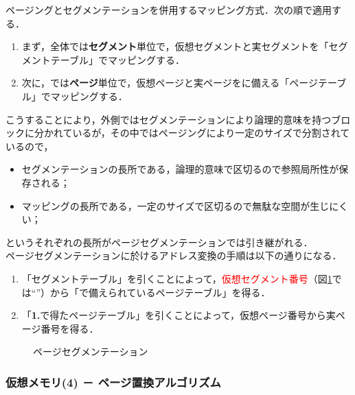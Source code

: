 \begin{enumerate}[label=\textbf{(\Alph*)}, labelsep=10pt, leftmargin=23pt]
		ページングとセグメンテーションを併用するマッピング方式．次の順で適用する．
		\begin{enumerate}[label=\textbf{\arabic*.}, labelsep=10pt, leftmargin=23pt]
			\item まず，全体では\textbf{セグメント}単位で，仮想セグメントと実セグメントを「セグメントテーブル」でマッピングする．
			\item 次に，では\textbf{ページ}単位で，仮想ページと実ページをに備える「ページテーブル」でマッピングする．
		\end{enumerate}
		こうすることにより，外側ではセグメンテーションにより論理的意味を持つブロックに分かれているが，その中ではページングにより一定のサイズで分割されているので，
		\begin{itemize}
			\item セグメンテーションの長所である，論理的意味で区切るので参照局所性が保存される；
			\item マッピングの長所である，一定のサイズで区切るので無駄な空間が生じにくい；
		\end{itemize}
		というそれぞれの長所がページセグメンテーションでは引き継がれる．\\
		ページセグメンテーションに於けるアドレス変換の手順は以下の通りになる．
		\begin{enumerate}[label=\textbf{\arabic*.}, labelsep=10pt, leftmargin=23pt]
			\item 「セグメントテーブル」を引くことによって，\textcolor{red}{仮想セグメント番号}（図\ref{fig:com_arch-10}では“\fbox{9}”）から「で備えられているページテーブル」を得る．
			\item 「\textbf{1.}で得たページテーブル」を引くことによって，仮想ページ番号から実ページ番号を得る．
		\end{enumerate}
		\begin{figure}[H]
			\begin{center}
				\caption{ページセグメンテーション}
				\label{fig:com_arch-10}
			\end{center}
		\end{figure}
\end{enumerate}



\subsubsection{仮想メモリ(4) － ページ置換アルゴリズム}\label{sec:com_arch-2-D-8}

